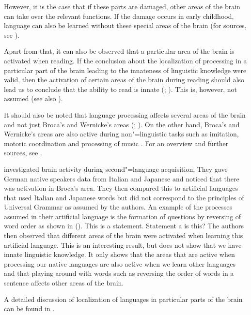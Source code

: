 However, it is the case that if these parts are damaged, other areas of the brain can take over the relevant
functions. If the damage occurs in early childhood, language can also be learned without these special areas
of the brain (for sources, see \citealp[Section~4.1]{Dabrowska2004a}).

Apart from that, it can also be observed that a particular area of the brain is activated when reading. If the conclusion about the localization of processing 
in a particular part of the brain leading to the innateness of linguistic knowledge were valid, then the activation of certain
areas of the brain during reading should also lead us to conclude that the ability to read is innate (\citealp[\page ]{EBJKSPP96a};
\citealp[]{Bishop2002a}). This is, however, not assumed (see also \citealp*[]{FHC2005a}). 

It should also be noted that language processing affects several areas of the brain and not just Broca's and Wernicke's areas (\citealp[]{FM2005a}; \citealp{Friederici2009a}). On the other hand, Broca's and Wernicke's areas are also active during non"=linguistic tasks
such as imitation, motoric coordination and processing of music \citep{MKGF2001a}. For an overview and further sources,
see .

\citet{MMGRRBW2003a} investigated brain activity during second"=language acquisition. They gave German native speakers data from Italian and Japanese and noticed
that there was activation in Broca's area. They then compared this to artificial languages that used Italian and Japanese words but did
not correspond to the principles of Universal Grammar as assumed by the authors. An example of the processes assumed in their artificial language is the formation
of questions by reversing of word order as shown in ().
\eal
\ex This is a statement.
\ex Statement a is this?
\zl
The authors then observed that different areas of the brain were activated when learning this artificial language. This is an interesting result, but does not show
that we have innate linguistic knowledge. It only shows that the areas that are active when processing our native languages are also active when we learn other
languages and that playing around with words such as reversing the order of words in a sentence affects other areas of the brain.

\addlines[2]
A detailed discussion of localization of languages in particular parts of the brain can be found
in .


